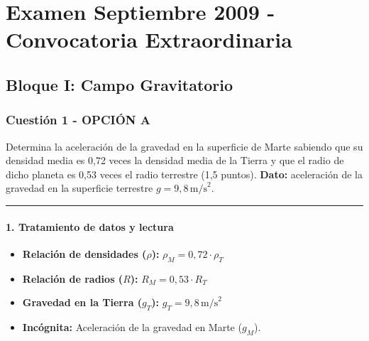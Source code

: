 \chapter{Examen Septiembre 2009 - Convocatoria Extraordinaria}
\label{chap:2009_sep_ext}

\section{Bloque I: Campo Gravitatorio}
\label{sec:grav_2009_sep_ext}

\subsection{Cuestión 1 - OPCIÓN A}
\label{subsec:1A_2009_sep_ext}

\begin{cajaenunciado}
Determina la aceleración de la gravedad en la superficie de Marte sabiendo que su densidad media es 0,72 veces la densidad media de la Tierra y que el radio de dicho planeta es 0,53 veces el radio terrestre (1,5 puntos).
\textbf{Dato:} aceleración de la gravedad en la superficie terrestre $g=9,8\,\text{m/s}^2$.
\end{cajaenunciado}
\hrule

\subsubsection*{1. Tratamiento de datos y lectura}
\begin{itemize}
    \item \textbf{Relación de densidades ($\rho$):} $\rho_M = 0,72 \cdot \rho_T$
    \item \textbf{Relación de radios ($R$):} $R_M = 0,53 \cdot R_T$
    \item \textbf{Gravedad en la Tierra ($g_T$):} $g_T = 9,8 \, \text{m/s}^2$
    \item \textbf{Incógnita:} Aceleración de la gravedad en Marte ($g_M$).
\end{itemize}

